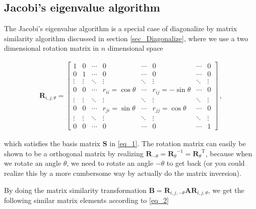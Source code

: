 \documentclass[11pt,english,a4paper]{article}
\begin{document}
\begin{flushleft}
\subsection{Jacobi's eigenvalue algorithm}

The Jacobi's eigenvalue algorithm is a special case of diagonalize by matrix similarity algorithm discussed in section \ref{sec_Diagonalize}, where we use a two dimensional rotation matrix in $n$ dimensional space

\begin{align}
\mathbf{R}_{i,j,\theta} = \begin{bmatrix} 1 & 0 & \cdots & 0 & \cdots & 0 & \cdots & 0 \\ 0 & 1 & \cdots & 0 & \cdots & 0 & \cdots & 0 \\ \vdots & \vdots & \ddots & \vdots & \ddots & \vdots & \ddots & \vdots \\ 0 & 0 & \cdots & r_{ii} = \cos \theta & \cdots & r_{ij} = -\sin\theta & \cdots & 0 \\ \vdots & \vdots & \ddots & \vdots & \ddots & \vdots & \ddots & \vdots \\ 0 & 0 & \cdots & r_{ji} = \sin \theta & \cdots & r_{jj} = \cos\theta & \cdots & 0 \\ \vdots & \vdots & \ddots & \vdots & \ddots & \vdots & \ddots & \vdots \\ 0 & 0 & \cdots & 0 & \cdots & 0 & \cdots & 1 \end{bmatrix} \,,
\label{eq_6}
\end{align} 

which satisfies the basis matrix $\mathbf{S}$ in \eqref{eq_1}. The rotation matrix can easily be shown to be a orthogonal matrix by realizing $\mathbf{R}_{-\theta} = {\mathbf{R}_{\theta}}^{-1} = {\mathbf{R}_{\theta}}^{\mathrm{T}}$, because when we rotate an angle $\theta$, we need to rotate an angle $-\theta$ to get back (or you could realize this by a more cumbersome way by actually do the matrix inversion). \linebreak

By doing the matrix similarity transformation $\mathbf{B} = \mathbf{R}_{i,j,-\theta}\mathbf{A}\mathbf{R}_{i,j,\theta}$, we get the following similar matrix elements according to \eqref{eq_2}


\end{flushleft}
\end{document}
